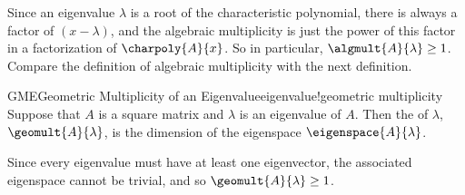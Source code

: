 %
Since an eigenvalue $\lambda$ is a root of the characteristic polynomial, there is always a factor of $(x-\lambda)$, and the algebraic multiplicity is just the power of this factor in a factorization of $\charpoly{A}{x}$.  So in particular, $\algmult{A}{\lambda}\geq 1$.  Compare the definition of algebraic multiplicity with the next definition.
%
\begin{definition}{GME}{Geometric Multiplicity of an Eigenvalue}{eigenvalue!geometric multiplicity}
Suppose that $A$ is a square matrix and $\lambda$ is an eigenvalue of $A$.  Then the  of $\lambda$, $\geomult{A}{\lambda}$, is the dimension of the eigenspace $\eigenspace{A}{\lambda}$.
\end{definition}
%
Since every eigenvalue must have at least one eigenvector, the associated eigenspace cannot be trivial, and so $\geomult{A}{\lambda}\geq 1$.
%
